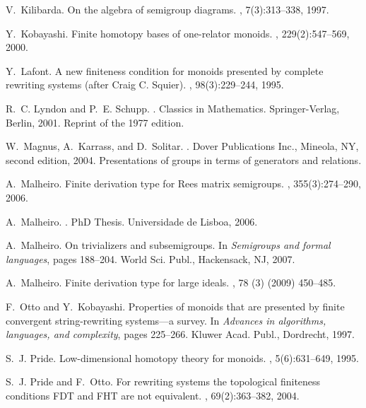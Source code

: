 \documentclass[11pt]{amsart}
\theoremstyle{plain}
\begin{document}
\begin{thebibliography}{10}
V.~Kilibarda.
\newblock On the algebra of semigroup diagrams.
, 7(3):313--338, 1997.

Y.~Kobayashi.
\newblock Finite homotopy bases of one-relator monoids.
, 229(2):547--569, 2000.

Y.~Lafont.
\newblock A new finiteness condition for monoids presented by complete
  rewriting systems (after {C}raig {C}. {S}quier).
, 98(3):229--244, 1995.

R.~C. Lyndon and P.~E. Schupp.
.
\newblock Classics in Mathematics. Springer-Verlag, Berlin, 2001.
\newblock Reprint of the 1977 edition.

W.~Magnus, A.~Karrass, and D.~Solitar.
.
\newblock Dover Publications Inc., Mineola, NY, second edition, 2004.
\newblock Presentations of groups in terms of generators and relations.

A.~Malheiro.
\newblock Finite derivation type for {R}ees matrix semigroups.
, 355(3):274--290, 2006.

A.~Malheiro.
.
\newblock PhD Thesis. Universidade de Lisboa, 2006.

A.~Malheiro.
\newblock On trivializers and subsemigroups.
\newblock In {\em Semigroups and formal languages}, pages 188--204. World Sci.
  Publ., Hackensack, NJ, 2007.

A.~Malheiro.
\newblock Finite derivation type for large ideals.
, 78 (3) (2009) 450--485.

F.~Otto and Y.~Kobayashi.
\newblock Properties of monoids that are presented by finite convergent
  string-rewriting systems---a survey.
\newblock In {\em Advances in algorithms, languages, and complexity}, pages
  225--266. Kluwer Acad. Publ., Dordrecht, 1997.

S.~J. Pride.
\newblock Low-dimensional homotopy theory for monoids.
, 5(6):631--649, 1995.

S.~J. Pride and F.~Otto.
\newblock For rewriting systems the topological finiteness conditions {FDT} and
  {FHT} are not equivalent.
, 69(2):363--382, 2004.


\end{thebibliography}
\end{document}
